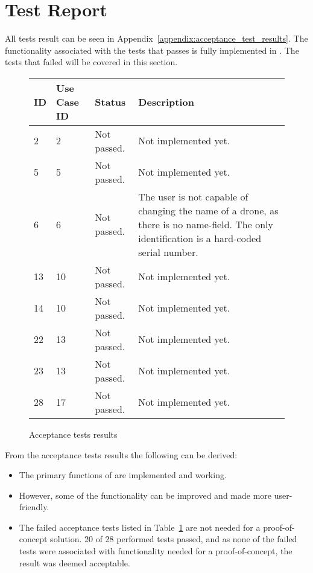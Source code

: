 \section{Test Report}
\label{sec:testing_report}

All tests result can be seen in Appendix~\ref{appendix:acceptance_test_results}.
The functionality associated with the tests that passes is fully implemented in \projectname{}.
The tests that failed will be covered in this section. \\


\begin{figure}[htb]
\begin{center}
\begin{tabular}{ | l | l | l | p{8cm} | }
  \hline
	\textbf{ID} & \textbf{Use Case ID} & \textbf{Status} & \textbf{Description} \\ \hline
	2 & 2 & Not passed. & Not implemented yet. \\ \hline
	5 & 5 & Not passed. & Not implemented yet. \\ \hline
	6 & 6 & Not passed. & The user is not capable of changing the name of a drone, as there is no name-field. The only identification is a hard-coded serial number. \\ \hline
	13 & 10 & Not passed. & Not implemented yet. \\ \hline
	14 & 10 & Not passed. & Not implemented yet. \\ \hline
	22 & 13 & Not passed. & Not implemented yet. \\ \hline
	23 & 13 & Not passed. & Not implemented yet. \\ \hline
	28 & 17 & Not passed. & Not implemented yet. \\ \hline
  \hline
\end{tabular}
\caption{Acceptance tests results}
\label{tab:acceptance_tests_results_first_run}
\end{center}
\end{figure}

From the acceptance tests results the following can be derived:

\begin{itemize}
	\item The primary functions of \projectname{} are implemented and working. 
	\item However, some of the functionality can be improved and made more user-friendly. 
	\item The failed acceptance tests listed in Table~\ref{tab:acceptance_tests_results_first_run} are not needed for a proof-of-concept solution. 20 of 28 performed tests passed, and as none of the failed tests were associated with functionality needed for a proof-of-concept, the result was deemed acceptable.
\end{itemize}


